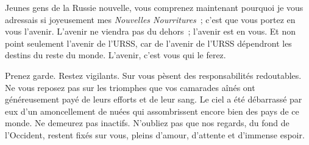 \documentclass[french,twoside]{book} %
\begin{document}
Jeunes gens de la Russie nouvelle, vous comprenez maintenant pourquoi je vous adressais si joyeusement mes \emph{Nouvelles Nourritures} ; c’est que vous portez en vous l’avenir. L’avenir ne viendra pas du dehors ; l’avenir est en vous. Et non point seulement l’avenir de l’URSS, car de l’avenir de l’URSS dépendront les destins du reste du monde. L’avenir, c’est vous qui le ferez.\par
Prenez garde. Restez vigilants. Sur vous pèsent des responsabilités redoutables. Ne vous reposez pas sur les triomphes que vos camarades aînés ont généreusement payé de leurs efforts et de leur sang. Le ciel a été débarrassé par eux d’un amoncellement de nuées qui assombrissent encore bien des pays de ce monde. Ne demeurez pas inactifs. N’oubliez pas que nos regards, du fond de l’Occident, restent fixés sur vous, pleins d’amour, d’attente et d’immense espoir.
\end{document}
